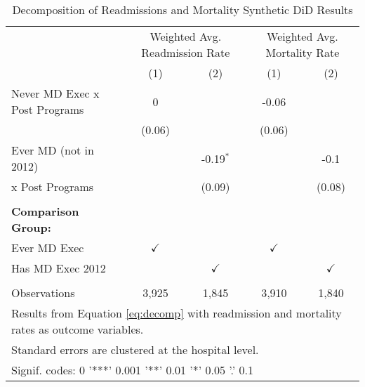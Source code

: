 \begin{table}[ht!]

\caption{\label{tab:MD_noMD_readmort_decomp_synth}Decomposition of Readmissions and Mortality Synthetic DiD Results}
\centering
\begin{tabular}[t]{lcccc}
\toprule
\multicolumn{1}{c}{ } & \multicolumn{2}{c}{Weighted Avg. Readmission Rate} & \multicolumn{2}{c}{Weighted Avg. Mortality Rate} \\
 & (1) & (2) & (1) & (2)\\
\midrule
Never MD Exec x Post Programs & 0 &  & -0.06 & \\
 & (0.06) &  & (0.06) & \\
Ever MD (not in 2012) &  & -0.19$^{*}$ &  & -0.1\\
 \hspace{3mm} x Post Programs &  & (0.09) &  & (0.08)\\
 &  &  &  & \\
\addlinespace
\textbf{Comparison Group:} &  &  &  & \\
Ever MD Exec & $\checkmark$ &  & $\checkmark$ & \\
Has MD Exec 2012 &  & $\checkmark$ &  & $\checkmark$\\
 &  &  &  & \\
Observations & 3,925 & 1,845 & 3,910 & 1,840\\
\bottomrule
\multicolumn{5}{l}{\textsuperscript{} Results from Equation \ref{eq:decomp} with readmission and mortality rates as outcome variables.}\\
\multicolumn{5}{l}{\textsuperscript{} Standard errors are clustered at the hospital level.}\\
\multicolumn{5}{l}{\textsuperscript{} Signif. codes: 0 '***' 0.001 '**' 0.01 '*' 0.05 '.' 0.1}\\
\end{tabular}
\end{table}
